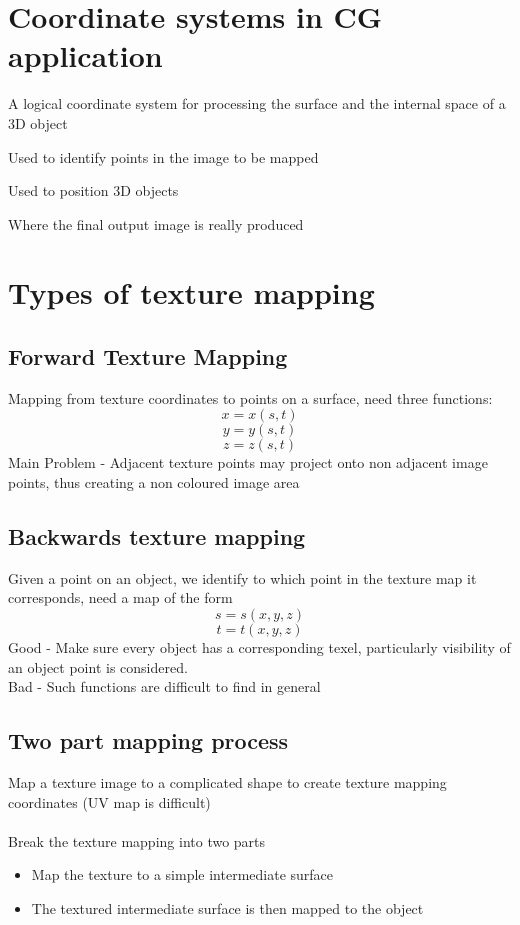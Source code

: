 \documentclass{article}[18pt]
\begin{document}
\section{Coordinate systems in CG application}
\begin{definition}
A logical coordinate system for processing the surface and the internal space of a 3D object
\end{definition}
\begin{definition}
Used to identify points in the image to be mapped
\end{definition}
\begin{definition}
Used to position 3D objects
\end{definition}
\begin{definition}
Where the final output image is really produced
\end{definition}
\section{Types of texture mapping}
\subsection{Forward Texture Mapping}
Mapping from texture coordinates to points on a surface, need three functions:
$$x=x(s,t)$$
$$y=y(s,t)$$
$$z=z(s,t)$$
Main Problem - Adjacent texture points may project onto non adjacent image points, thus creating a non coloured image area
\subsection{Backwards texture mapping}
Given a point on an object, we identify to which point in the texture map it corresponds, need a map of the form
$$s=s(x,y,z)$$
$$t=t(x,y,z)$$
Good - Make sure every object has a corresponding texel, particularly visibility of an object point is considered.\\
Bad - Such functions are difficult to find in general
\subsection{Two part mapping process}
Map a texture image to a complicated shape to create texture mapping coordinates (UV map is difficult)\\
\\
Break the texture mapping into two parts
\begin{itemize}
	\item Map the texture to a simple intermediate surface
	\item The textured intermediate surface is then mapped to the object
\end{itemize}
\end{document}
